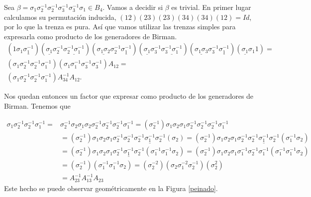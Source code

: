 \documentclass[TFG.tex]{subfiles}
\begin{document}
\begin{ej}
Sea $\beta=\sigma_1\sigma_2^{-1}\sigma_2^{-1}\sigma_3^{-1}\sigma_3^{-1}\sigma_1\in B_4$. Vamos a decidir si $\beta$ es trivial. En primer lugar calculamos su permutación inducida, $(12)(23)(23)(34)(34)(12)=Id$, por lo que la trenza es pura. Así que vamos utilizar las trenzas simples para expresarla como producto de los generadores de Birman. 
\begin{gather*}
(1\sigma_1\underline{\sigma_1^{-1}})(\underline{\sigma_1}\sigma_2^{-1}\underline{\sigma_2^{-1}\sigma_1^{-1}})(\underline{\sigma_1\sigma_2}\sigma_2^{-1}\underline{\sigma_1^{-1}})(\underline{\sigma_1}\sigma_3^{-1}\underline{\sigma_3^{-1}\sigma_1^{-1}})(\underline{\sigma_1\sigma_3}\sigma_3^{-1}\underline{\sigma_1^{-1}})(\underline{\sigma_1}\sigma_1 1)=\\
(\sigma_1\sigma_2^{-1}\sigma_2^{-1}\sigma_1^{-1})(\sigma_1\sigma_1^{-1}\sigma_3^{-1}\sigma_3^{-1})A_{12}=\\
(\sigma_1\sigma_2^{-1}\sigma_2^{-1}\sigma_1^{-1})A_{34}^{-1}A_{12}.
\end{gather*}

Nos quedan entonces un factor que expresar como producto de los generadores de Birman. Tenemos que
 
\begin{align*}
\sigma_1\sigma_2^{-1}\sigma_2^{-1}\sigma_1^{-1}=& \sigma_2^{-1}\underline{\sigma_2\sigma_1\sigma_2}\sigma_2^{-1}\sigma_2^{-1}\sigma_2^{-1}\sigma_1^{-1}=(\sigma_2^{-1})\sigma_1\sigma_2\sigma_1\sigma_2^{-1}\sigma_2^{-1}\sigma_2^{-1}\sigma_1^{-1}\\
&=(\sigma_2^{-1})\sigma_1\sigma_2\sigma_1\sigma_2^{-1}\sigma_2^{-1}\underline{\sigma_2^{-1}\sigma_1^{-1}\sigma_2^{-1}}(\sigma_2)=(\sigma_2^{-1})\sigma_1\sigma_2\sigma_1\sigma_2^{-1}\underline{\sigma_2^{-1}\sigma_1^{-1}\sigma_2^{-1}}(\sigma_1^{-1}\sigma_2)\\
&=(\sigma_2^{-1})\sigma_1\sigma_2\sigma_1\underline{\sigma_2^{-1}\sigma_1^{-1}\sigma_2^{-1}}(\sigma_1^{-1}\sigma_1^{-1}\sigma_2)=(\sigma_2^{-1})\sigma_1\sigma_2\sigma_1\sigma_1^{-1}\sigma_2^{-1}\sigma_1^{-1}(\sigma_1^{-1}\sigma_1^{-1}\sigma_2)\\
&=(\sigma_2^{-1})(\sigma_1^{-1}\sigma_1^{-1}\sigma_2)= (\sigma_2^{-2})(\sigma_2\sigma_1^{-2}\sigma_2^{-1})(\sigma_2^2)\\
&=A_{23}^{-1}A_{13}^{-1}A_{23}
\end{align*}
Este hecho se puede observar geométricamente en la Figura \ref{peinado}.




\end{ej}
\end{document}

